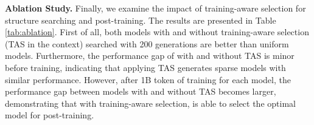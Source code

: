 \label{exp:ablation}
\begin{table}[t]
    \centering
    \caption{Ablation of our proposed training-aware offspring selection (TAS) on Llama-2-7B with target level 5.}
    \label{tab:ablation}
     \vspace{-1em}
\end{table}

\noindent \textbf{Ablation Study.}
Finally, we examine the impact of training-aware selection for structure searching and post-training. The results are presented in Table \ref{tab:ablation}. First of all, both models with and without training-aware selection (TAS in the context) searched with 200 generations are better than uniform models. Furthermore, the performance gap of \sysname with and without TAS is minor before training, indicating that applying TAS generates sparse models with similar performance. However, after 1B token of training for each model, the performance gap between models with and without TAS becomes larger, demonstrating that with training-aware selection, \sysname is able to select the optimal model for post-training.